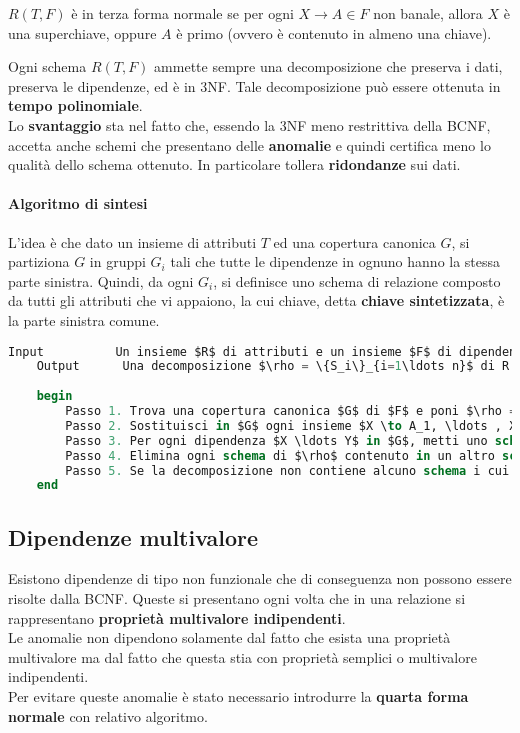  \begin{theorem}
 	$R(T, F)$ è in terza forma normale se per ogni $X \to A \in F$ non banale, allora $X$ è una superchiave, oppure $A$ è primo (ovvero è contenuto in almeno una chiave).
 \end{theorem}
 
Ogni schema $R(T, F)$ ammette sempre una decomposizione che preserva i dati, preserva le dipendenze, ed è in 3NF. Tale decomposizione può essere ottenuta in \textbf{tempo polinomiale}.\\
Lo \textbf{svantaggio} sta nel fatto che, essendo la 3NF meno restrittiva della BCNF, accetta anche schemi che presentano delle \textbf{anomalie} e quindi certifica meno lo qualità dello schema ottenuto.
In particolare tollera \textbf{ridondanze} sui dati.

\paragraph{Algoritmo di sintesi}
L'idea è che dato un insieme di attributi $T$ ed una copertura canonica $G$, si partiziona $G$ in gruppi $G_i$ tali che tutte le dipendenze in ognuno hanno la stessa parte sinistra. Quindi, da ogni $G_i$, si definisce uno schema di relazione composto da tutti gli attributi che vi appaiono, la cui chiave, detta \textbf{chiave sintetizzata}, è la parte sinistra comune.

\begin{lstlisting}[language=SQL, mathescape]
	Input		   Un insieme $R$ di attributi e un insieme $F$ di dipendenze su $R$
	Output		Una decomposizione $\rho = \{S_i\}_{i=1\ldots n}$ di R tale che preservi dati e dipendenze e ogni $S_i$ sia in 3NF, rispetto alle proiezioni di $F$ su $S_i$
	
	begin
		Passo 1. Trova una copertura canonica $G$ di $F$ e poni $\rho = \{\}$
		Passo 2. Sostituisci in $G$ ogni insieme $X \to A_1, \ldots , X \to A_h$ di dipendenze con lo stesso determinante, con la dipendenza $X \to A_1 \ldots A_h$
		Passo 3. Per ogni dipendenza $X \ldots Y$ in $G$, metti uno schema con attributi $XY$ in $\rho$
		Passo 4. Elimina ogni schema di $\rho$ contenuto in un altro schema di $\rho$
		Passo 5. Se la decomposizione non contiene alcuno schema i cui attributi costituiscano una superchiave per $R$, aggiungi ad essa lo schema con attributi $W$, con $W$ una chiave di $R$
	end
\end{lstlisting}

\subsection{Dipendenze multivalore}
Esistono dipendenze di tipo non funzionale che di conseguenza non possono essere risolte dalla BCNF. Queste si presentano ogni volta che in una relazione si rappresentano \textbf{proprietà multivalore indipendenti}.\\
Le anomalie non dipendono solamente dal fatto che esista una proprietà multivalore ma dal fatto che questa stia con proprietà semplici o multivalore indipendenti.\\
Per evitare queste anomalie è stato necessario introdurre la \textbf{quarta forma normale} con relativo algoritmo.